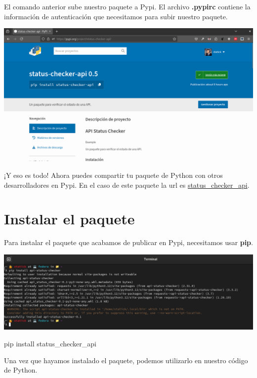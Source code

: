 \documentclass[
  a4paper,
  DIV=11,
  numbers=noendperiod,
  onepage,
  openany]{scrreprt}
\newenvironment{Shaded}{\begin{snugshade}}{\end{snugshade}}
\newcommand{\ExtensionTok}[1]{\textcolor[rgb]{0.00,0.23,0.31}{#1}}
\newcommand{\NormalTok}[1]{\textcolor[rgb]{0.00,0.23,0.31}{#1}}
\begin{document}
\begin{tcolorbox}
El comando anterior sube nuestro paquete a Pypi. El archivo
\textbf{.pypirc} contiene la información de autenticación que
necesitamos para subir nuestro paquete.

\includegraphics{unidades/unidad4/images/paste-10.png}

¡Y eso es todo! Ahora puedes compartir tu paquete de Python con otros
desarrolladores en Pypi. En el caso de este paquete la url es
\href{https://pypi.org/project/status-checker-api/}{status\_checker\_api}.

\chapter{Instalar el paquete}\label{instalar-el-paquete}

Para instalar el paquete que acabamos de publicar en Pypi, necesitamos
usar \textbf{pip}.

\includegraphics{unidades/unidad4/images/paste-4.png}

\begin{Shaded}
\begin{Highlighting}[]
\ExtensionTok{pip}\NormalTok{ install status\_checker\_api}
\end{Highlighting}
\end{Shaded}

Una vez que hayamos instalado el paquete, podemos utilizarlo en nuestro
código de Python.


\end{tcolorbox}
\end{document}
